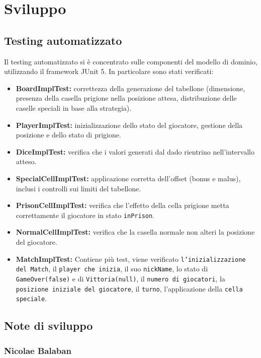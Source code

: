 \documentclass[a4paper,12pt]{report}
\begin{document}
\chapter{Sviluppo}
\section{Testing automatizzato}

Il testing automatizzato si è concentrato sulle componenti del modello di dominio, utilizzando il framework JUnit 5. In particolare sono stati verificati:

\begin{itemize}
 \item \textbf{BoardImplTest:} correttezza della generazione del tabellone (dimensione, presenza della casella prigione nella posizione attesa, distribuzione delle caselle speciali in base alla strategia).
 \item \textbf{PlayerImplTest:} inizializzazione dello stato del giocatore, gestione della posizione e dello stato di prigione.
 \item \textbf{DiceImplTest:} verifica che i valori generati dal dado rientrino nell'intervallo atteso.
 \item \textbf{SpecialCellImplTest:} applicazione corretta dell'offset (bonus e malus), inclusi i controlli sui limiti del tabellone.
 \item \textbf{PrisonCellImplTest:} verifica che l'effetto della cella prigione metta correttamente il giocatore in stato \texttt{inPrison}.
 \item \textbf{NormalCellImplTest:} verifica che la casella normale non alteri la posizione del giocatore.
 \item \textbf{MatchImplTest:} Contiene più test, viene verificato \texttt{l'inizializzazione del Match},  il \texttt{player che inizia}, il suo \texttt{nickName}, lo stato di \texttt{GameOver(false)} e di \texttt{Vittoria(null)}, il \texttt{numero di giocatori}, la \texttt{posizione iniziale del giocatore}, il \texttt{turno}, l'applicazione della \texttt{cella speciale}. 
\end{itemize}



\section{Note di sviluppo}
\subsection{Nicolae Balaban}
\end{document}
